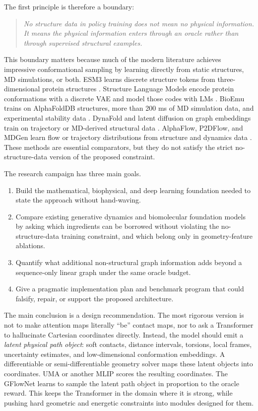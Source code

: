 \documentclass[11pt]{article}
\begin{document}
The first principle is therefore a boundary:
\begin{quote}
\emph{No structure data in policy training does not mean no physical information. It means the physical information enters through an oracle rather than through supervised structural examples.}
\end{quote}

This boundary matters because much of the modern literature achieves impressive conformational sampling by learning directly from static structures, MD simulations, or both. ESM3 learns discrete structure tokens from three-dimensional protein structures \cite{hayes2024esm3}. Structure Language Models encode protein conformations with a discrete VAE and model those codes with LMs \cite{lu2025slm}. BioEmu trains on AlphaFoldDB structures, more than 200 ms of MD simulation data, and experimental stability data \cite{lewis2025bioemu}. DynaFold and latent diffusion on graph embeddings train on trajectory or MD-derived structural data \cite{fan2025dynafold,sengar2025ldfpg}. AlphaFlow, P2DFlow, and MDGen learn flow or trajectory distributions from structure and dynamics data \cite{jing2024alphaflow,jin2025p2dflow,jing2024mdgen}. These methods are essential comparators, but they do not satisfy the strict no-structure-data version of the proposed constraint.

The research campaign has three main goals.

\begin{enumerate}[leftmargin=2em]
  \item Build the mathematical, biophysical, and deep learning foundation needed to state the approach without hand-waving.
  \item Compare existing generative dynamics and biomolecular foundation models by asking which ingredients can be borrowed without violating the no-structure-data training constraint, and which belong only in geometry-feature ablations.
  \item Quantify what additional non-structural graph information adds beyond a sequence-only linear graph under the same oracle budget.
  \item Give a pragmatic implementation plan and benchmark program that could falsify, repair, or support the proposed architecture.
\end{enumerate}

The main conclusion is a design recommendation. The most rigorous version is not to make attention maps literally ``be'' contact maps, nor to ask a Transformer to hallucinate Cartesian coordinates directly. Instead, the model should emit a \emph{latent physical path object}: soft contacts, distance intervals, torsions, local frames, uncertainty estimates, and low-dimensional conformation embeddings. A differentiable or semi-differentiable geometry solver maps these latent objects into coordinates. UMA or another MLIP scores the resulting coordinates. The GFlowNet learns to sample the latent path object in proportion to the oracle reward. This keeps the Transformer in the domain where it is strong, while pushing hard geometric and energetic constraints into modules designed for them.
\end{document}
